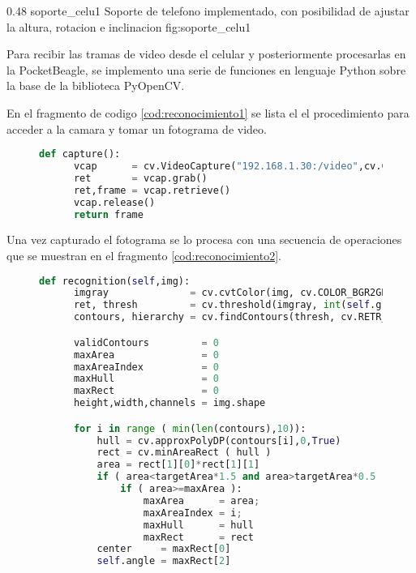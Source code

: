 \subfiga 
      {0.48} 
      {soporte_celu1}
      {Soporte de telefono implementado, con posibilidad de ajustar la altura, rotacion e inclinacion }
      {fig:soporte_celu1}

   Para recibir las tramas de video desde el celular y posteriormente procesarlas en la PocketBeagle, se implemento una serie de funciones en lenguaje Python sobre la base de la biblioteca PyOpenCV. \par
   En el fragmento de codigo \ref{cod:reconocimiento1} se lista el el procedimiento para acceder a la camara y tomar un fotograma de video.\par

\begin{figure}[h]
   \begin{lstlisting}[language=python,caption={Conexion a la camara del telefono por Wi-Fi y captura de un fotograma para su posterior procesamiento.},label={cod:reconocimiento1}]
   def capture():
      vcap      = cv.VideoCapture("192.168.1.30:/video",cv.CAP_FFMPEG);
      ret       = vcap.grab()
      ret,frame = vcap.retrieve()
      vcap.release()
      return frame
   \end{lstlisting}
\end{figure}

Una vez capturado el fotograma se lo procesa con una secuencia de operaciones que se muestran en el fragmento \ref{cod:reconocimiento2}.

\begin{figure}[h]
   \begin{lstlisting}[language=python,caption={Algoritmo principal de reconocimiento de marcas en un fotograma},label={cod:reconocimiento2}]
def recognition(self,img):
      imgray              = cv.cvtColor(img, cv.COLOR_BGR2GRAY)
      ret, thresh         = cv.threshold(imgray, int(self.grayThresh), 0xff, cv.THRESH_BINARY_INV)
      contours, hierarchy = cv.findContours(thresh, cv.RETR_EXTERNAL, cv.CHAIN_APPROX_SIMPLE)

      validContours         = 0
      maxArea               = 0
      maxAreaIndex          = 0
      maxHull               = 0
      maxRect               = 0
      height,width,channels = img.shape

      for i in range ( min(len(contours),10)):
          hull = cv.approxPolyDP(contours[i],0,True) 
          rect = cv.minAreaRect ( hull )
          area = rect[1][0]*rect[1][1]
          if ( area<targetArea*1.5 and area>targetArea*0.5 ):
              if ( area>=maxArea ):
                  maxArea      = area;
                  maxAreaIndex = i;
                  maxHull      = hull
                  maxRect      = rect
          center     = maxRect[0]
          self.angle = maxRect[2]
   \end{lstlisting}
\end{figure}


